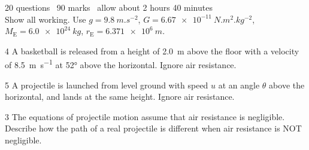 \documentclass[12pt]{article}
\begin{document}
\begin{center}
  20 questions \textperiodcentered\ 90 marks \textperiodcentered\ allow about 2 hours 40 minutes\\[2pt]
  Show all working. Use $g = \qty{9.8}{m.s^{-2}}$, $G = \qty{6.67e-11}{N.m^2.kg^{-2}}$,
  $M_\mathrm{E} = \qty{6.0e24}{kg}$, $r_\mathrm{E} = \qty{6.371e6}{m}$.
\end{center}


\begin{saq}{4}
A basketball is released from a height of \qty{2.0}{m} above the floor with a velocity of
\qty{8.5}{m.s^{-1}} at \ang{52} above the horizontal. Ignore air resistance.
\end{saq}

\begin{saq}{5}
A projectile is launched from level ground with speed $u$ at an angle $\theta$ above the horizontal,
and lands at the same height. Ignore air resistance.
\end{saq}

\Needspace{98mm}
\begin{saq}{3}
The equations of projectile motion assume that air resistance is negligible. Describe how the
path of a real projectile is different when air resistance is NOT negligible.
\end{saq}
\end{document}
